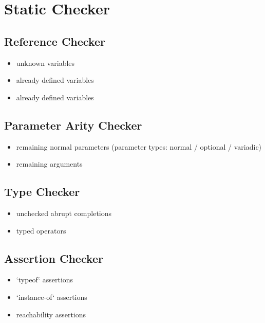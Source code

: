 \section{Static Checker}\label{sec:checker}

\subsection{Reference Checker}
\begin{itemize}
  \item unknown variables
  \item already defined variables
  \item already defined variables
\end{itemize}

\subsection{Parameter Arity Checker}
\begin{itemize}
  \item remaining normal parameters
    (parameter types: normal / optional / variadic)
  \item remaining arguments
\end{itemize}

\subsection{Type Checker}
\begin{itemize}
  \item unchecked abrupt completions
  \item typed operators
\end{itemize}

\subsection{Assertion Checker}
\begin{itemize}
  \item `typeof` assertions
  \item `instance-of` assertions
  \item reachability assertions
\end{itemize}

